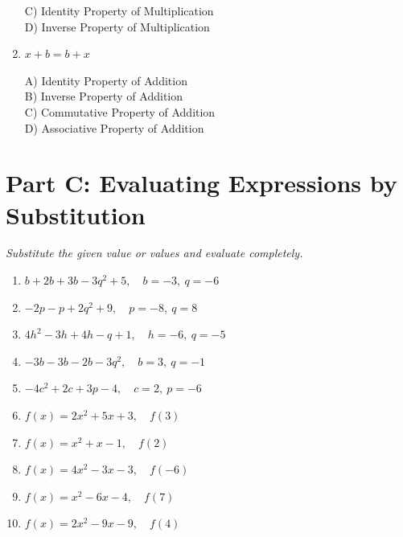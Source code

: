 \documentclass[11pt]{article}
\begin{document}
\begin{enumerate}
\begin{minipage}{\linewidth}
C) Identity Property of Multiplication \\
D) Inverse Property of Multiplication
\end{minipage}
  \vspace{0.3cm}
  \item $x + b = b + x$
\\[2pt]
\begin{minipage}{\linewidth}
A) Identity Property of Addition \\
B) Inverse Property of Addition \\
C) Commutative Property of Addition \\
D) Associative Property of Addition
\end{minipage}
  \vspace{0.3cm}
\end{enumerate}

\section*{Part C: Evaluating Expressions by Substitution}
\noindent\textit{Substitute the given value or values and evaluate completely.}
\begin{multicols}{2}
\begin{enumerate}
  \item $b + 2 b + 3 b - 3 q^{2} + 5, \quad b = -3,\ q = -6$
  \vspace{1.3cm}
  \item $- 2 p - p + 2 q^{2} + 9, \quad p = -8,\ q = 8$
  \vspace{1.3cm}
  \item $4 h^{2} - 3 h + 4 h - q + 1, \quad h = -6,\ q = -5$
  \vspace{1.3cm}
  \item $- 3 b - 3 b - 2 b - 3 q^{2}, \quad b = 3,\ q = -1$
  \vspace{1.3cm}
  \item $- 4 c^{2} + 2 c + 3 p - 4, \quad c = 2,\ p = -6$
  \vspace{1.3cm}
  \item $f(x) = 2x^{2} + 5x + 3, \quad f(3)$
  \vspace{1.3cm}
  \item $f(x) = x^{2} + x - 1, \quad f(2)$
  \vspace{1.3cm}
  \item $f(x) = 4x^{2} - 3x - 3, \quad f(-6)$
  \vspace{1.3cm}
  \item $f(x) = x^{2} - 6x - 4, \quad f(7)$
  \vspace{1.3cm}
  \item $f(x) = 2x^{2} - 9x - 9, \quad f(4)$
  \vspace{1.3cm}
\end{enumerate}
\end{multicols}
\end{document}
